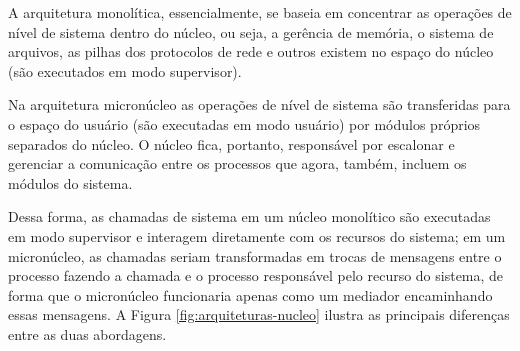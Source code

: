 A arquitetura monolítica, essencialmente, se baseia em concentrar as operações de nível de sistema dentro do núcleo, ou seja, a gerência de memória, o sistema de arquivos, as pilhas dos protocolos de rede e outros existem no espaço do núcleo (são executados em modo supervisor).

Na arquitetura micronúcleo as operações de nível de sistema são transferidas para o espaço do usuário (são executadas em modo usuário) por módulos próprios separados do núcleo. O núcleo fica, portanto, responsável por escalonar e gerenciar a comunicação entre os processos que agora, também, incluem os módulos do sistema.

Dessa forma, as chamadas de sistema em um núcleo monolítico são executadas em modo supervisor e interagem diretamente com os recursos do sistema; em um micronúcleo, as chamadas seriam transformadas em trocas de mensagens entre o processo fazendo a chamada e o processo responsável pelo recurso do sistema, de forma que o micronúcleo funcionaria apenas como um mediador encaminhando essas mensagens. A Figura \ref{fig:arquiteturas-nucleo} ilustra as principais diferenças entre as duas abordagens.

